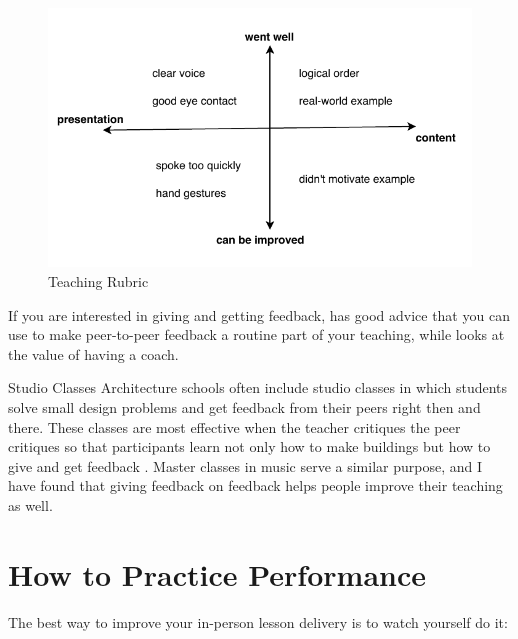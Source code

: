 \begin{figure}
\centering
\includegraphics{../../figures/2x2-rubric.pdf}
\caption{Teaching Rubric}
\label{f:performance-rubric}
\end{figure}

If you are interested in giving and getting feedback,
\cite{Gorm2014} has good advice
that you can use to make peer-to-peer feedback a routine part of your teaching,
while \cite{Gawa2011} looks at the value of having a coach.

\begin{aside}{Studio Classes}
  Architecture schools often include studio classes
  in which students solve small design problems
  and get feedback from their peers right then and there.
  These classes are most effective when the teacher critiques the peer critiques
  so that participants learn not only how to make buildings
  but how to give and get feedback \cite{Scho1984}.
  Master classes in music serve a similar purpose,
  and I have found that giving feedback on feedback
  helps people improve their teaching as well.
\end{aside}

\section{How to Practice Performance}\label{s:performance-practice}

The best way to improve your in-person lesson delivery
is to watch yourself do it:

